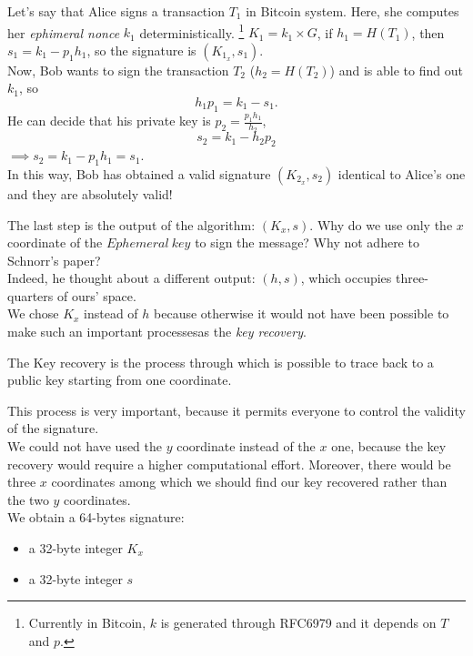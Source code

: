 \begin{example}
	Let's say that Alice signs a transaction $T_{1}$ in Bitcoin system. Here, she computes her \textit{ephimeral nonce} $k_{1}$ deterministically. \footnote{Currently in Bitcoin, $k$ is generated through RFC6979 and it depends on $T$ and $p$.}
	$K_{1}=k_{1}\times G$, if $h_{1}=H(T_{1})$, then $s_{1}=k_{1}-p_{1}h_{1}$, so the signature is $(K_{1_{x}},s_{1})$.\\
	Now, Bob wants to sign the transaction $T_{2}$ ($h_{2}=H(T_{2})$) and is able to find out $k_{1}$, so
	\begin{equation*}
	h_{1}p_{1}=k_{1}-s_{1}.
	\end{equation*}
	He can decide that his private key is $p_{2}=\frac{p_{1}h_{1}}{h_{2}}$,
	\begin{equation*}
	s_{2}=k_{1}-h_{2}p_{2}	
	\end{equation*}
	$\implies s_{2}=k_{1}-p_{1}h_{1}=s_{1}$.\\
	In this way, Bob has obtained a valid signature $(K_{2_{x}},s_{2})$ identical to Alice's one and they are absolutely valid!
\end{example}

The last step is the output of the algorithm: $(K_{x},s)$.
Why do we use only the $x$ coordinate of the $Ephemeral\ key$ to sign the message? Why not adhere to Schnorr's paper?\\
Indeed, he thought about a different output: $(h,s)$, which occupies three-quarters of ours' space.\\
We chose $K_{x}$ instead of $h$ because otherwise it would not have been possible to make such an important processesas the \textit{key recovery}.

\begin{teorema}
	The Key recovery is the process through which is possible to trace back to a public key starting from one coordinate.
\end{teorema}

This process is very important, because it permits everyone to control the validity of the signature.\\
We could not have used the $y$ coordinate instead of the $x$ one, because the key recovery would require a higher computational effort. Moreover, there would be three $x$ coordinates among which we should find our key recovered rather than the two $y$ coordinates.\\
We obtain a 64-bytes signature:
\begin{itemize}
	\item a 32-byte integer $K_{x}$
	\item a 32-byte integer $s$ \\
\end{itemize}


